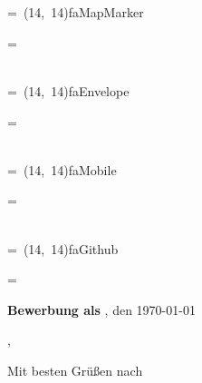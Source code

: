 \documentclass[10pt,A4]{article}
\newcommand*{\vcenteredhbox}[1]{\begingroup
\setbox0=\hbox{#1}\parbox{\wd0}{\box0}\endgroup}
\newcommand{\icon}[2]{
	\makebox(#2, #2){\textcolor{textcolor}{\csname fa#1\endcsname}}}	%
\newcommand{\icontext}[3]{ 						%
	\vcenteredhbox{\icon{#1}{#2}} \vcenteredhbox{\textcolor{textcolor}{#3}}
}
\newcommand*{\contactpage}[1]{
	\begin{minipage}{0.25\textwidth}
		\icontext{MapMarker}{#1}{\Location}\\
		\icontext{Envelope}{#1}{\Mail}\\
		\icontext{Mobile}{#1}{\Phone}\\
		\icontext{Github}{#1}{\Link}
	\end{minipage}
}
\newcounter{a}
\newcounter{b}
\newcounter{c}
\begin{document}
\begin{minipage}[c][2.25cm][c]{0.55\textwidth}
	\vspace{0pt}
	\Huge
	\textcolor{textcolor}{\textbf{\Name}}

	\Large
	\textcolor{color1}{~\Role}
	\vspace{\fill}
	
	\footnotesize
	\textcolor{color2}{~~~}
\end{minipage}
\hfill
\contactpage{14}
\hspace*{-0.5cm}
\vfill
\begin{minipage}[b]{1\textwidth}

\large
	\textcolor{textcolor}{\textbf{\CompanyName}}

	\textcolor{textcolor}{\Address}

	\textcolor{textcolor}{\City}
	\newline
	\newline
	\newline
	\newline

	\textcolor{textcolor}{\Large{\textbf{Bewerbung als \NewRole}}}
	\hspace*{\fill}
	\textcolor{textcolor}{\Location, den \today}
	
\end{minipage}
\vfill
\begin{minipage}[t][19cm][t]{0.95\textwidth}
\begin{flushleft}
\textcolor{textcolor}{\Recruiter,}
\newline
\newline

\textcolor{textcolor}{\Letter
\newline
\newline
\newline
\newline
Mit besten Grüßen nach \City
\newline
\newline
\newline
\Name
\newline
\newline
\newline
\newline
\textcolor{textcolor}{\Postskriptum}
}
\end{flushleft}
\end{minipage}
\end{document}
